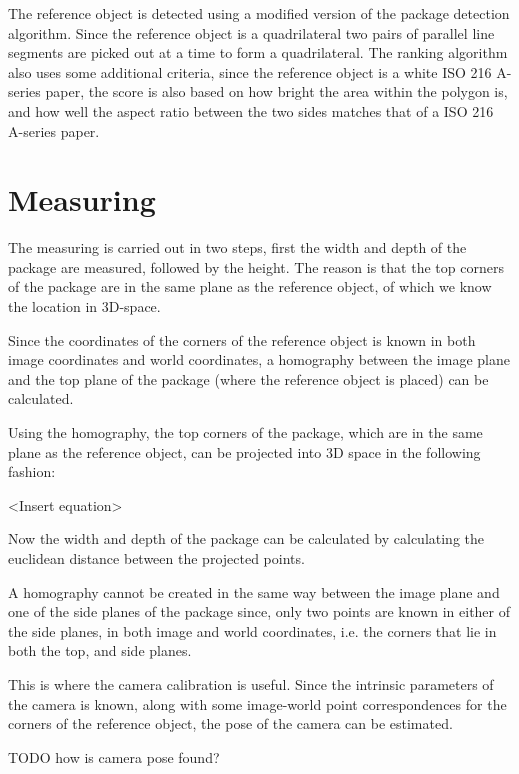 The reference object is detected using a modified version of the package detection algorithm.
Since the reference object is a quadrilateral two pairs of parallel line segments are picked out at a time to form a quadrilateral.
The ranking algorithm also uses some additional criteria, since the reference object is a white ISO 216 A-series  paper, the score is also based on how bright the area within the polygon is, and how well the aspect ratio between the two sides matches that of a ISO 216 A-series paper.

\section{Measuring}


The measuring is carried out in two steps, first the width and depth of the package are measured, followed by the height. The reason is that the top corners of the package are in the same plane as the reference object, of which we know the location in 3D-space.

Since the coordinates of the corners of the reference object is known in both image coordinates and world coordinates, a homography between the image plane and the top plane of the package (where the reference object is placed) can be calculated.

Using the homography, the top corners of the package, which are in the same plane as the reference object, can be projected into 3D space in the following fashion:

<Insert equation> %

Now the width and depth of the package can be calculated by calculating the euclidean distance between the projected points.

A homography cannot be created in the same way between the image plane and one of the side planes of the package since, only two points are known in either of the side planes, in both image and world coordinates, i.e. the corners that lie in both the top, and side planes.

This is where the camera calibration is useful. 
Since the intrinsic parameters of the camera is known, along with some image-world point correspondences for the corners of the reference object, the pose of the camera can be estimated. 

TODO how is camera pose found?%

